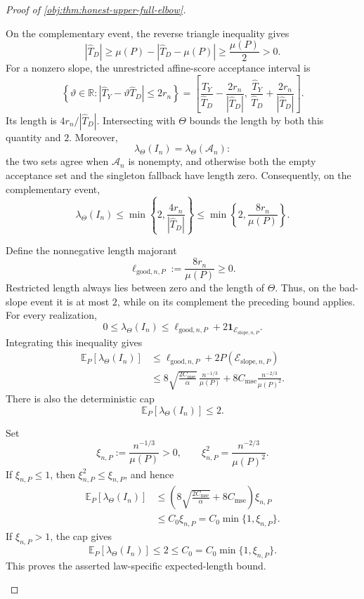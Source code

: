 \documentclass[11pt]{article}
\begin{document}
\begin{proof}[Proof of \cref{obj:thm:honest-upper-full-elbow}]
\begin{enumerate}
On the complementary event, the reverse triangle inequality gives
\[
|\widehat T_D|
\ge \mu(P)-|\widehat T_D-\mu(P)|
\ge\frac{\mu(P)}2>0.
\]
For a nonzero slope, the unrestricted affine-score acceptance interval is
\[
\left\{\vartheta\in\mathbb R:
|\widehat T_Y-\vartheta\widehat T_D|\le2r_n\right\}
=
\left[
\frac{\widehat T_Y}{\widehat T_D}
-\frac{2r_n}{|\widehat T_D|},
\,
\frac{\widehat T_Y}{\widehat T_D}
+\frac{2r_n}{|\widehat T_D|}
\right].
\]
Its length is \(4r_n/|\widehat T_D|\). Intersecting with \(\Theta\) bounds
the length by both this quantity and \(2\). Moreover,
\[
\lambda_\Theta(I_n)=\lambda_\Theta(\mathcal A_n):
\]
the two sets agree when \(\mathcal A_n\) is nonempty, and otherwise both
the empty acceptance set and the singleton fallback have length zero.
Consequently, on the complementary event,
\[
\lambda_\Theta(I_n)
\le
\min\left\{2,\frac{4r_n}{|\widehat T_D|}\right\}
\le
\min\left\{2,\frac{8r_n}{\mu(P)}\right\}.
\]

Define the nonnegative length majorant
\[
\ell_{\mathrm{good},n,P}:=\frac{8r_n}{\mu(P)}\ge0.
\]
Restricted length always lies between zero and the length of \(\Theta\).
Thus, on the bad-slope event it is at most \(2\), while on its complement
the preceding bound applies. For every realization,
\[
0\le\lambda_\Theta(I_n)
\le
\ell_{\mathrm{good},n,P}
+2\mathbf1_{\mathcal E_{\mathrm{slope},n,P}}.
\]
Integrating this inequality gives
\[
\begin{aligned}
\mathbb E_P[\lambda_\Theta(I_n)]
&\le
\ell_{\mathrm{good},n,P}
+2P(\mathcal E_{\mathrm{slope},n,P})\\
&\le
8\sqrt{\frac{2C_{\mathrm{mse}}}{\alpha}}\,
\frac{n^{-1/3}}{\mu(P)}
+
8C_{\mathrm{mse}}\frac{n^{-2/3}}{\mu(P)^2}.
\end{aligned}
\]
There is also the deterministic cap
\[
\mathbb E_P[\lambda_\Theta(I_n)]\le2.
\]

Set
\[
\xi_{n,P}:=\frac{n^{-1/3}}{\mu(P)}>0,
\qquad
\xi_{n,P}^2=\frac{n^{-2/3}}{\mu(P)^2}.
\]
If \(\xi_{n,P}\le1\), then \(\xi_{n,P}^2\le\xi_{n,P}\), and hence
\[
\begin{aligned}
\mathbb E_P[\lambda_\Theta(I_n)]
&\le
\left(
8\sqrt{\frac{2C_{\mathrm{mse}}}{\alpha}}
+8C_{\mathrm{mse}}
\right)\xi_{n,P}\\
&\le C_0\xi_{n,P}
=C_0\min\{1,\xi_{n,P}\}.
\end{aligned}
\]
If \(\xi_{n,P}>1\), the cap gives
\[
\mathbb E_P[\lambda_\Theta(I_n)]
\le2\le C_0
=C_0\min\{1,\xi_{n,P}\}.
\]
This proves the asserted law-specific expected-length bound.


\end{enumerate}
\end{proof}
\end{document}
